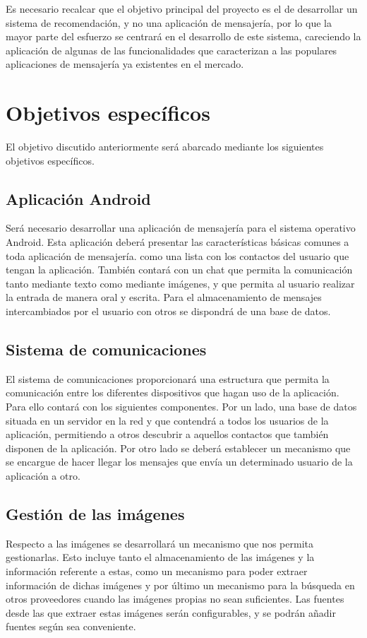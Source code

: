 Es necesario recalcar que el objetivo principal del proyecto es el de desarrollar un sistema de recomendación, y no una aplicación de mensajería, por lo que la mayor parte del esfuerzo se centrará en el desarrollo de este sistema, careciendo la aplicación de algunas de las funcionalidades que caracterizan a las populares aplicaciones de mensajería ya existentes en el mercado.


\section{Objetivos específicos}

El objetivo discutido anteriormente será abarcado mediante los siguientes objetivos específicos.

\subsection{Aplicación Android}
Será necesario desarrollar una aplicación de mensajería para el sistema operativo Android. Esta aplicación deberá presentar las características básicas comunes a toda aplicación de mensajería. como una lista con los contactos del usuario que tengan la aplicación. También contará con un chat que permita la comunicación tanto mediante texto como mediante imágenes, y que permita al usuario realizar la entrada de manera oral y escrita. Para el almacenamiento de mensajes intercambiados por el usuario con otros se dispondrá de una base de datos.

\subsection{Sistema de comunicaciones}
El sistema de comunicaciones proporcionará una estructura que permita la comunicación entre los diferentes dispositivos que hagan uso de la aplicación. Para ello contará con los siguientes componentes. Por un lado, una base de datos situada en un servidor en la red y que contendrá a todos los usuarios de la aplicación, permitiendo a otros descubrir a aquellos contactos que también disponen de la aplicación. Por otro lado se deberá establecer un mecanismo que se encargue de hacer llegar los mensajes que envía un determinado usuario de la aplicación a otro.  

\subsection{Gestión de las imágenes}
Respecto a las imágenes se  desarrollará un mecanismo que nos permita gestionarlas. Esto incluye tanto el almacenamiento de las imágenes y la información referente a estas, como un mecanismo para poder extraer información de dichas imágenes y por último un mecanismo para la búsqueda en otros proveedores cuando las imágenes propias no sean suficientes. Las fuentes desde las que extraer estas imágenes serán configurables, y se podrán añadir fuentes según sea conveniente.

